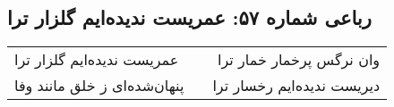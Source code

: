 \begin{center}
\section*{رباعی شماره ۵۷: عمریست ندیده‌ایم گلزار ترا}
\label{sec:0057}
\begin{longtable}{l p{0.5cm} r}
عمریست ندیده‌ایم گلزار ترا
&&
وان نرگس پرخمار خمار ترا
\\
پنهان‌شده‌ای ز خلق مانند وفا
&&
دیریست ندیده‌ایم رخسار ترا
\\
\end{longtable}
\end{center}
